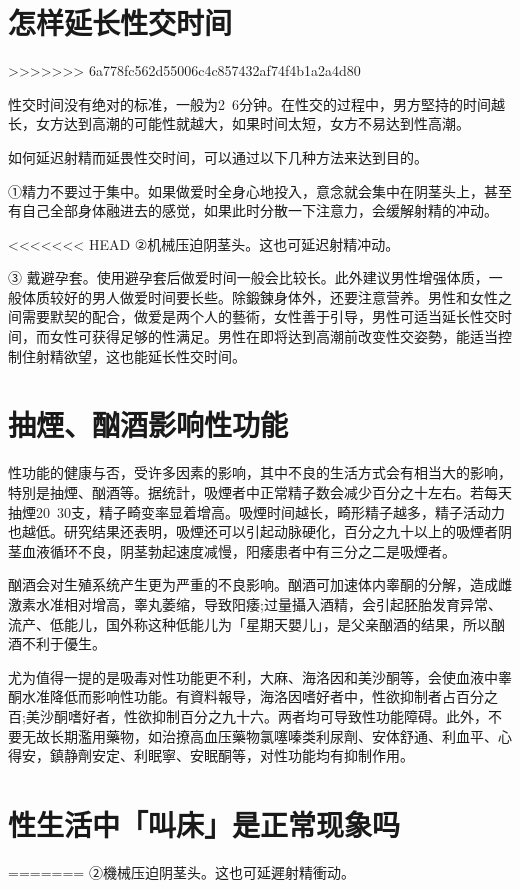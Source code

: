 \documentclass[12pt,UTF8]{ctexbook}
\begin{document}
\section{怎样延长性交时间}
>>>>>>> 6a778fc562d55006c4c857432af74f4b1a2a4d80

性交时间没有绝对的标准，一般为2~6分钟。在性交的过程中，男方堅持的时间越长，女方达到高潮的可能性就越大，如果时间太短，女方不易达到性高潮。

如何延迟射精而延畏性交时间，可以通过以下几种方法来达到目的。

①精力不要过于集中。如果做爱时全身心地投入，意念就会集中在阴茎头上，甚至有自己全部身体融进去的感觉，如果此时分散一下注意力，会缓解射精的冲动。

<<<<<<< HEAD
②机械压迫阴茎头。这也可延迟射精冲动。

③ 戴避孕套。使用避孕套后做爱时间一般会比较长。此外建议男性增强体质，一般体质较好的男人做爱时间要长些。除鍛鍊身体外，还要注意营养。男性和女性之间需要默契的配合，做爱是两个人的藝術，女性善于引导，男性可适当延长性交时间，而女性可获得足够的性满足。男性在即将达到高潮前改变性交姿勢，能适当控制住射精欲望，这也能延长性交时间。

\section{抽煙、酗酒影响性功能}

性功能的健康与否，受许多因素的影响，其中不良的生活方式会有相当大的影响，特別是抽煙、酗酒等。据统計，吸煙者中正常精子数会减少百分之十左右。若每天抽煙20~30支，精子畸变率显着增高。吸煙时间越长，畸形精子越多，精子活动力也越低。研究结果还表明，吸煙还可以引起动脉硬化，百分之九十以上的吸煙者阴茎血液循环不良，阴茎勃起速度减慢，阳痿患者中有三分之二是吸煙者。

酗酒会对生殖系统产生更为严重的不良影响。酗酒可加速体内睾酮的分解，造成雌激素水准相对增高，睾丸萎缩，导致阳痿;过量攝入酒精，会引起胚胎发育异常、流产、低能儿，国外称这种低能儿为「星期天嬰儿」，是父亲酗酒的结果，所以酗酒不利于優生。

尤为值得一提的是吸毒对性功能更不利，大麻、海洛因和美沙酮等，会使血液中睾酮水准降低而影响性功能。有資料報导，海洛因嗜好者中，性欲抑制者占百分之百;美沙酮嗜好者，性欲抑制百分之九十六。两者均可导致性功能障碍。此外，不要无故长期濫用藥物，如治撩高血压藥物氯噻嗪类利尿劑、安体舒通、利血平、心得安，鎮静劑安定、利眠寧、安眠酮等，对性功能均有抑制作用。

\section{性生活中「叫床」是正常现象吗}
=======
②機械压迫阴茎头。这也可延遲射精衝动。
\end{document}
